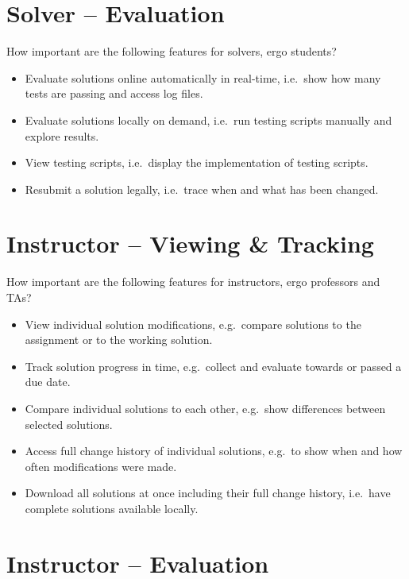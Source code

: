 \section{Solver -- Evaluation}\label{sec:solver-evaluation}

How important are the following features for solvers, ergo students?

\begin{itemize}
\item
  Evaluate solutions online automatically in real-time, i.e.~show how many tests are passing and access log files.
\item
  Evaluate solutions locally on demand, i.e.~run testing scripts manually and explore results.
\item
  View testing scripts, i.e.~display the implementation of testing scripts.
\item
  Resubmit a solution legally, i.e.~trace when and what has been changed.
\end{itemize}

\section{Instructor -- Viewing \& Tracking}\label{sec:instructor-viewing-tracking}

How important are the following features for instructors, ergo professors and TAs?

\begin{itemize}
\item
  View individual solution modifications, e.g.~compare solutions to the assignment or to the working solution.
\item
  Track solution progress in time, e.g.~collect and evaluate towards or passed a due date.
\item
  Compare individual solutions to each other, e.g.~show differences between selected solutions.
\item
  Access full change history of individual solutions, e.g.~to show when and how often modifications were made.
\item
  Download all solutions at once including their full change history, i.e.~have complete solutions available locally.
\end{itemize}

\section{Instructor -- Evaluation}\label{sec:instructor-evaluation}

